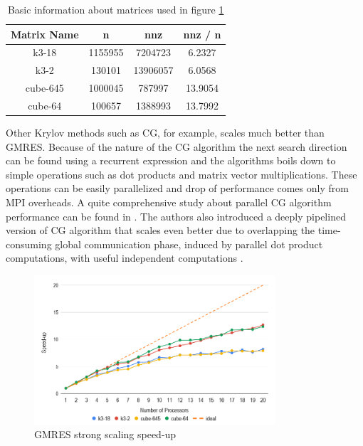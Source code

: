 \begin{table}[htpb]
\centering
\begin{tabular}{|c|c|c|c|}
\hline
Matrix Name & n       & nnz      & nnz / n \\ \hline
k3-18       & 1155955 & 7204723  & 6.2327  \\ \hline
k3-2        & 130101  & 13906057 & 6.0568  \\ \hline
cube-645    & 1000045 & 787997   & 13.9054 \\ \hline
cube-64     & 100657  & 1388993  & 13.7992 \\ \hline
\end{tabular}
\caption{Basic information about matrices used in figure \ref{fig:gmres-strong-scaling-speed-up}}
\label{table:matrix-info-1}
\end{table}

Other Krylov methods such as CG, for example, scales much better than GMRES. Because of the nature of the CG algorithm the next search direction can be found using a recurrent expression and the algorithms boils down to simple operations such as dot products and matrix vector multiplications. These operations can be easily parallelized and drop of performance comes only from MPI overheads. A quite comprehensive study about parallel CG algorithm performance can be found in \cite{sparse-la:cg}. The authors also introduced a deeply pipelined version of CG algorithm that scales even better due to overlapping the time-consuming global communication phase, induced by parallel dot product computations, with useful independent computations \cite{sparse-la:cg}.\\

\begin{figure}[htpb]
  \centering
  \includegraphics[width=0.8\textwidth]{figures/chapter-2/gmres-strong-scaling-speedup.png}
\caption{GMRES strong scaling speed-up}
\label{fig:gmres-strong-scaling-speed-up}
\end{figure}



